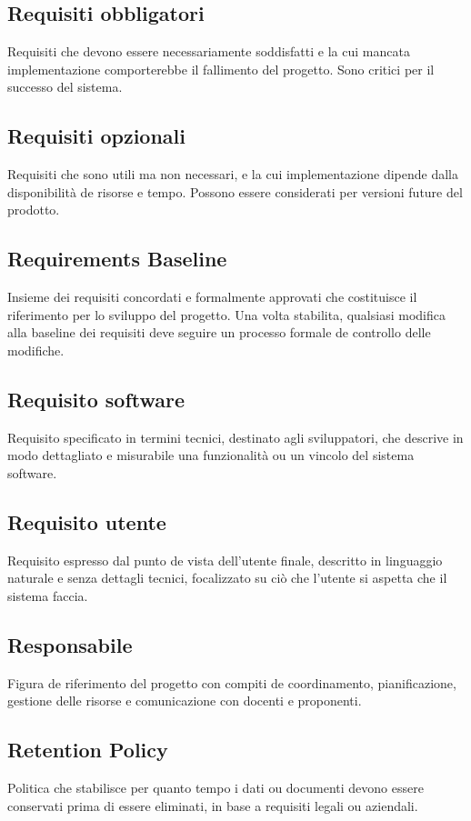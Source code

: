 \documentclass[a4paper,11pt]{article}
\begin{document}
\subsection{Requisiti obbligatori}
Requisiti che devono essere necessariamente soddisfatti e la cui mancata implementazione comporterebbe il fallimento del progetto. Sono critici per il successo del sistema.

\subsection{Requisiti opzionali}
Requisiti che sono utili ma non necessari, e la cui implementazione dipende dalla disponibilità de risorse e tempo. Possono essere considerati per versioni future del prodotto.

\subsection{Requirements Baseline}
Insieme dei requisiti concordati e formalmente approvati che costituisce il riferimento per lo sviluppo del progetto. Una volta stabilita, qualsiasi modifica alla baseline dei requisiti deve seguire un processo formale de controllo delle modifiche.

\subsection{Requisito software}
Requisito specificato in termini tecnici, destinato agli sviluppatori, che descrive in modo dettagliato e misurabile una funzionalità ou un vincolo del sistema software.

\subsection{Requisito utente}
Requisito espresso dal punto de vista dell'utente finale, descritto in linguaggio naturale e senza dettagli tecnici, focalizzato su ciò che l'utente si aspetta che il sistema faccia.

\subsection{Responsabile}
Figura de riferimento del progetto con compiti de coordinamento, pianificazione, gestione delle risorse e comunicazione con docenti e proponenti.

\subsection{Retention Policy}
Politica che stabilisce per quanto tempo i dati ou documenti devono essere conservati prima di essere eliminati, in base a requisiti legali ou aziendali.
\end{document}
